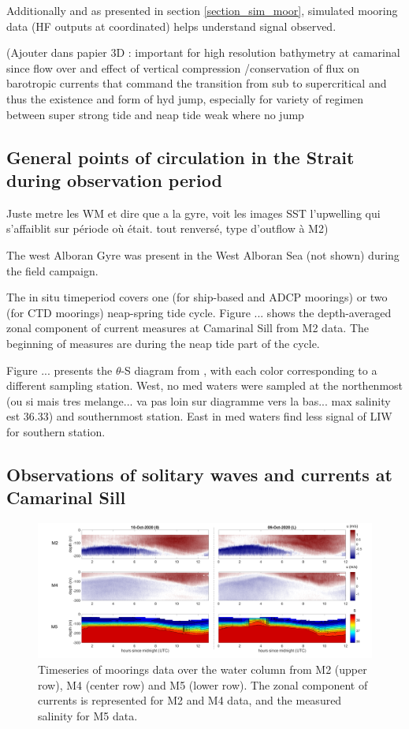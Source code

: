 Additionally and as presented in section \ref{section_sim_moor}, simulated mooring data (HF outputs at coordinated) helps understand signal observed.



(Ajouter dans papier 3D : important for high resolution bathymetry at camarinal since flow over and effect of vertical compression /conservation of flux on barotropic currents that command the transition from sub to supercritical and thus the existence and form of hyd jump, especially for variety of regimen between super strong tide and neap tide weak where no jump



\subsection{General points of circulation in the Strait during observation period}

Juste metre les WM et dire que a la gyre, voit les images SST l'upwelling qui s'affaiblit sur période où était.  tout renversé, type d'outflow à M2)

The west Alboran Gyre was present in the West Alboran Sea (not shown) during the field campaign. 




The in situ timeperiod covers one (for ship-based and ADCP moorings) or two (for CTD moorings) neap-spring tide cycle. Figure ... shows the depth-averaged zonal component of current measures at Camarinal Sill from M2 data. The beginning of measures are during the neap tide part of the cycle.


Figure ... presents the $\theta$-S diagram from , with each color corresponding to a different sampling station.
West, no med waters were sampled at the northenmost (ou si mais tres melange... va pas loin sur diagramme vers la bas... max salinity est 36.33) and southernmost station. East in med waters find less signal of LIW for southern station.


\subsection{Observations of solitary waves and currents at Camarinal Sill}
\label{section_obs_moor}

\begin{figure}[!h]
 \includegraphics[width=\textwidth]{./GBR3D/US_moorings1.png}
 \caption {Timeseries of moorings data over the water column from M2 (upper row), M4 (center row) and M5 (lower row). The zonal component of currents is represented for M2 and M4 data, and the measured salinity for M5 data.}
 \label{fig_moor_US1}
\end{figure}

